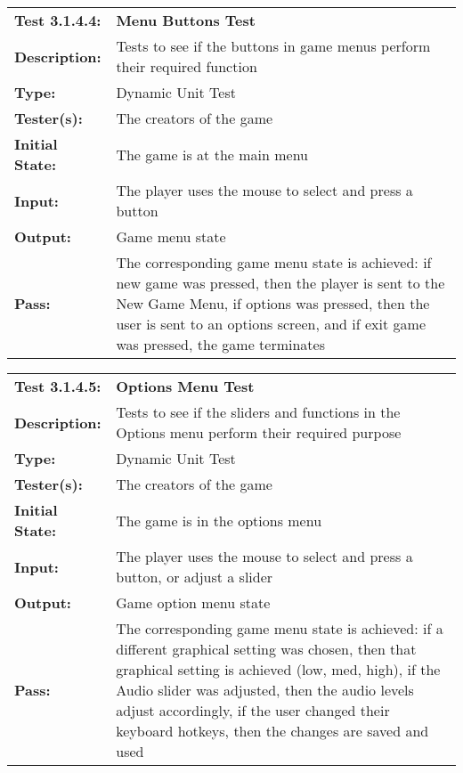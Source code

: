 \documentclass[12pt, titlepage]{article}
\begin{document}
\begin{mdframed}[linewidth=1pt]
\begin{tabularx}{\textwidth}{@{}p{3cm}X@{}}
{\bf Test 3.1.4.4:} & {\bf Menu Buttons Test}\\[\baselineskip]
{\bf Description:} & Tests to see if the buttons in game menus perform their required function\\[0.5\baselineskip]
{\bf Type:} & Dynamic Unit Test\\[0.5\baselineskip]
{\bf Tester(s):} & The creators of the game\\[0.5\baselineskip]
{\bf Initial State:} & The game is at the main menu\\[0.5\baselineskip]
{\bf Input:} & The player uses the mouse to select and press a button \\[0.5\baselineskip]
{\bf Output:} & Game menu state\\[0.5\baselineskip]
{\bf Pass:} & The corresponding game menu state is achieved: if new game was pressed, then the player is sent to the New Game Menu, if options was pressed, then the user is sent to an options screen, and if exit game was pressed, the game terminates
\end{tabularx}
\end{mdframed}

\begin{mdframed}[linewidth=1pt]
\begin{tabularx}{\textwidth}{@{}p{3cm}X@{}}
{\bf Test 3.1.4.5:} & {\bf Options Menu Test}\\[\baselineskip]
{\bf Description:} & Tests to see if the sliders and functions in the Options menu perform their required purpose\\[0.5\baselineskip]
{\bf Type:} & Dynamic Unit Test\\[0.5\baselineskip]
{\bf Tester(s):} & The creators of the game\\[0.5\baselineskip]
{\bf Initial State:} & The game is in the options menu\\[0.5\baselineskip]
{\bf Input:} & The player uses the mouse to select and press a button, or adjust a slider \\[0.5\baselineskip]
{\bf Output:} & Game option menu state\\[0.5\baselineskip]
{\bf Pass:} & The corresponding game menu state is achieved: if a different graphical setting was chosen, then that graphical setting is achieved (low, med, high), if the Audio slider was adjusted, then the audio levels adjust accordingly, if the user changed their keyboard hotkeys, then the changes are saved and used
\end{tabularx}
\end{mdframed}
\end{document}
